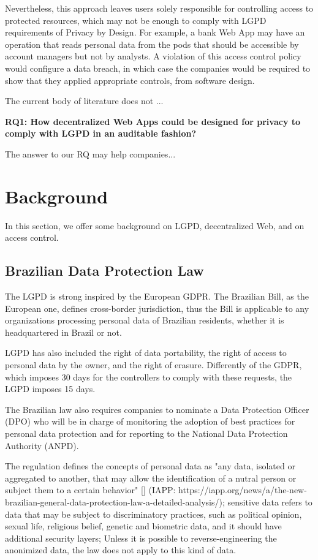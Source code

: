 \documentclass[sigconf]{acmart}
\begin{document}
Nevertheless, this approach leaves users solely responsible for controlling access to protected resources, which may not be enough to comply with LGPD requirements of Privacy by Design. For example, a bank Web App may have an operation that reads personal data from the pods that should be accessible by account managers but not by analysts. A violation of this access control policy would configure a data breach, in which case the companies would be required to show that they applied appropriate controls, from software design.

The current body of literature does not ...

\vspace{0.15cm}
\noindent \textbf{RQ1: How decentralized Web Apps could be designed for privacy to comply with LGPD in an auditable fashion?}
\vspace{0.15cm}

The answer to our RQ may help companies...


\section{Background}
In this section, we offer some background on LGPD, decentralized Web, and on access control.

\subsection{Brazilian Data Protection Law}
The LGPD is strong inspired by the European GDPR. The Brazilian Bill, as the European one, defines cross-border jurisdiction, thus the Bill is applicable to any organizations processing personal data of Brazilian residents, whether it is headquartered in Brazil or not.

LGPD has also included the right of data portability, the right of access to personal data by the owner, and the right of erasure. Differently of the GDPR, which imposes 30 days for the controllers to comply with these requests, the LGPD imposes 15 days.

The Brazilian law also requires companies to nominate a Data Protection Officer (DPO) who will be in charge of monitoring the adoption of best practices for personal data protection and for reporting to the National Data Protection Authority (ANPD).

The regulation defines the concepts of personal data as "any data, isolated or aggregated to another, that may allow the identification of a nutral person or subject them to a certain behavior" [] (IAPP: https://iapp.org/news/a/the-new-brazilian-general-data-protection-law-a-detailed-analysis/); sensitive data refers to data that may be subject to discriminatory practices, such as political opinion, sexual life, religious belief, genetic and biometric data, and it should have additional security layers; Unless it is possible to reverse-engineering the anonimized data, the law does not apply to this kind of data.
\end{document}
